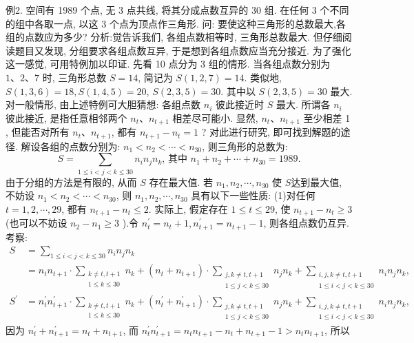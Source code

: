 例2. 空间有 1989 个点, 无 3 点共线, 将其分成点数互异的 30 组.
在任何 3 个不同的组中各取一点, 以这 3 个点为顶点作三角形.
问: 要使这种三角形的总数最大,各组的点数应为多少? 
分析:觉告诉我们, 各组点数相等时, 三角形总数最大.
但仔细阅读题目又发现, 分组要求各组点数互异, 于是想到各组点数应当充分接近.
为了强化这一感觉, 可用特例加以印证.
先看 10 点分为 3 组的情形.
当各组点数分别为 $1 、 2 、 7$ 时, 三角形总数 $S=14$, 简记为 $S(1,2,7)=14$. 类似地, $S(1,3,6)=18, S(1,4,5)=20$, $S(2,3,5)=30$. 其中以 $S(2,3,5)=30$ 最大.
对一般情形, 由上述特例可大胆猜想: 各组点数 $n_i$ 彼此接近时 $S$ 最大.
所谓各 $n_i$ 彼此接近, 是指任意相邻两个 $n_t 、 n_{t+1}$ 相差尽可能小.
显然, $n_t 、 n_{t+1}$ 至少相差 1 , 但能否对所有 $n_t 、 n_{t+1}$, 都有 $n_{t+1}-n_t=1$ ? 对此进行研究, 即可找到解题的途径.
解设各组的点数分别为: $n_1<n_2<\cdots<n_{30}$, 则三角形的总数为:
$$
S=\sum_{1 \leqslant i<j<k \leqslant 30} n_i n_j n_k \text {, 其中 } n_1+n_2+\cdots+n_{30}=1989 .
$$
由于分组的方法是有限的, 从而 $S$ 存在最大值.
若 $n_1, n_2, \cdots, n_{30}$ 使 $S$达到最大值, 不妨设 $n_1<n_2<\cdots<n_{30}$, 则 $n_1, n_2, \cdots, n_{30}$ 具有以下一些性质:
(1)对任何 $t=1,2, \cdots, 29$, 都有 $n_{t+1}-n_t \leqslant 2$.
实际上, 假定存在 $1 \leqslant t \leqslant 29$, 使 $n_{t+1}-n_t \geqslant 3$ (也可以不妨设 $n_2-n_1 \geqslant 3$ ).令 $n_t^{\prime}=n_t+1, n_{t+1}^{\prime}=n_{t+1}-1$, 则各组点数仍互异.
考察:
$$
\begin{aligned}
S & =\sum_{1 \leqslant i<j<k \leqslant 30} n_i n_j n_k \\
& =n_t n_{t+1} \cdot \sum_{\substack{k \neq t, t+1 \\
1 \leqslant k \leqslant 30}} n_k+\left(n_t+n_{t+1}\right) \cdot \sum_{\substack{j, k \neq t, t+1 \\
1 \leqslant j<k \leqslant 30}} n_j n_k+\sum_{\substack{i, j, k \neq t, t+1 \\
1 \leqslant i<j<k \leqslant 30}} n_i n_j n_k, \\
S^{\prime} & =n_t^{\prime} n_{t+1}^{\prime} \cdot \sum_{\substack{k \neq t, t+1 \\
1 \leqslant k \leqslant 30}} n_k+\left(n_t^{\prime}+n_{t+1}^{\prime}\right) \cdot \sum_{\substack{j, k \neq t, t+1 \\
1 \leqslant j<k \leqslant 30}} n_j n_k+\sum_{\substack{i, j, k \neq t, t+1 \\
1 \leqslant i<j<k \leqslant 30}} n_i n_j n_k,
\end{aligned}
$$
因为 $n_t^{\prime}+n_{t+1}^{\prime}=n_t+n_{t+1}$, 而 $n_t^{\prime} n_{t+1}^{\prime}=n_t n_{t+1}-n_t+n_{t+1}-1>n_t n_{t+1}$, 所以

